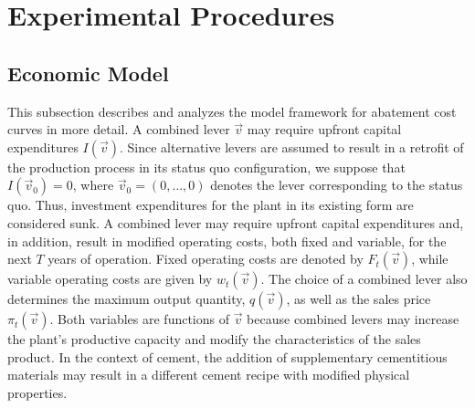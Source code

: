 \documentclass[12pt, a4paper]{article} %
\begin{document}
\section*{Experimental Procedures}
\label{sec: methods}

\renewcommand{\figurename}{Extended Data Figure}
\renewcommand{\tablename}{Extended Data Table}
\setcounter{figure}{0}
\setcounter{table}{0}

\subsection*{Economic Model}

This subsection describes and analyzes the model framework for abatement cost curves in more detail. A combined lever $\vec{v}$ may require upfront capital expenditures $I(\vec{v})$. Since alternative levers are assumed to result in a retrofit of the production process in its status quo configuration, we suppose that $I(\vec{v}_0) = 0$, where $\vec{v}_0 =(0, \ldots ,0)$ denotes the lever corresponding to the status quo. Thus, investment expenditures for the plant in its existing form are considered sunk. A combined lever may require upfront capital expenditures and, in addition, result in modified operating costs, both fixed and variable, for the next $T$ years of operation. Fixed operating costs are denoted by $F_t(\vec{v})$, while variable operating costs are given by $w_t(\vec{v})$. The choice of a combined lever also determines the maximum output quantity, $q(\vec{v})$, as well as the sales price $\pi_t(\vec{v})$. Both variables are functions of $\vec{v}$ because combined levers may increase the plant's productive capacity and modify the characteristics of the sales product. In the context of cement, the addition of supplementary cementitious materials may result in a different cement recipe with modified physical properties.
\end{document}
